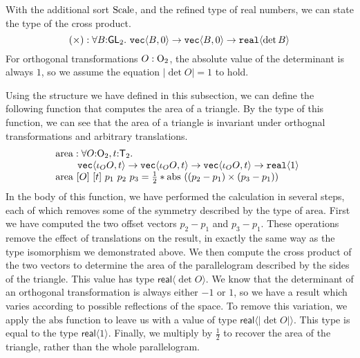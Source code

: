 With the additional sort $\mathrm{Scale}$, and the refined type of real
numbers, we can state the type of the cross product.
\begin{displaymath}
  (\times) : \forall B \mathord: \mathsf{GL}_2.\ \texttt{vec}\langle B,0 \rangle \to \texttt{vec}\langle B,0 \rangle \to \texttt{real}\langle \det B \rangle
\end{displaymath}
For orthogonal transformations $O : \mathrm{O}_2$, the absolute value of
the determinant is always $1$, so we assume the equation $|\det O| =
1$ to hold.

\begin{example}
  Using the structure we have defined in this subsection, we can
  define the following function that computes the area of a
  triangle. By the type of this function, we can see that the area of
  a triangle is invariant under orthognal transformations and
  arbitrary translations.
  \begin{displaymath}
    \begin{array}{@{}l}
      \mathrm{area} : \forall O\mathord:\Orth_2, t\mathord:\SynTransl_2.\ \\
      \hspace{0.8cm}\tyPrim{vec}{\iota_OO, t} \to \tyPrim{vec}{\iota_OO, t} \to \tyPrim{vec}{\iota_OO, t} \to \tyPrim{real}{1} \\
      \mathrm{area}\ [O]\ [t]\ p_1\ p_2\ p_3 = \frac{1}{2} * \mathrm{abs}\ ((p_2 - p_1) \times (p_3 - p_1))
    \end{array}
  \end{displaymath}
  In the body of this function, we have performed the calculation in
  several steps, each of which removes some of the symmetry described
  by the type of $\mathrm{area}$. First we have computed the two offset
  vectors $p_2 - p_1$ and $p_3 - p_1$. These operations remove the
  effect of translations on the result, in exactly the same way as the
  type isomorphism we demonstrated above. We then compute the cross
  product of the two vectors to determine the area of the
  parallelogram described by the sides of the triangle. This value has
  type $\mathsf{real}\langle \det O \rangle$. We know that the
  determinant of an orthogonal transformation is always either $-1$ or
  $1$, so we have a result which varies according to possible
  reflections of the space. To remove this variation, we apply the
  $\mathrm{abs}$ function to leave us with a value of type
  $\mathsf{real}\langle |\det O| \rangle$. This type is equal to the
  type $\mathsf{real}\langle 1 \rangle$. Finally, we multiply by
  $\frac{1}{2}$ to recover the area of the triangle, rather than the
  whole parallelogram.
\end{example}

